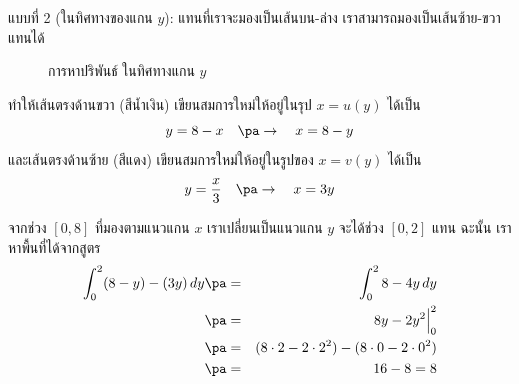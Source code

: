 \begin{frame}
\begin{sol} แบบที่ 2 (ในทิศทางของแกน $y$): \pa แทนที่เราจะมองเป็นเส้นบน-ล่าง เราสามารถมองเป็นเส้นซ้าย-ขวาแทนได้ \pa

\begin{figure}[h!]
\centering
{}
\caption{การหาปริพันธ์ ในทิศทางแกน $y$}
\end{figure}


ทำให้เส้นตรงด้านขวา (สีน้ำเงิน) เขียนสมการใหม่ให้อยู่ในรุป $x = u(y)$ ได้เป็น \pa
\[ y = 8-x \quad \pa \rightarrow \quad x = 8-y\] \pa
และเส้นตรงด้านซ้าย (สีแดง) เขียนสมการใหม่ให้อยู่ในรูปของ $x = v(y)$ ได้เป็น \pa
\[ y = \frac{x}{3} \quad \pa \rightarrow \quad x = 3y\]
\end{sol}
\end{frame}

\begin{frame}
\begin{sol} 
จากช่วง $[0,8]$ ที่มองตามแนวแกน $x$ เราเปลี่ยนเป็นแนวแกน $y$ จะได้ช่วง $[0,2]$ แทน \pa ฉะนั้น เราหาพื้นที่ได้จากสูตร
\begin{eqnarray*}
\int_0^2 (8-y) - (3y) \, dy \pa &=& \int_0^2 8 - 4y \, dy \\ \pa
&=& 8y - 2y^2 \Big|_0^2 \\ \pa
&=& ( 8\cdot 2 - 2\cdot 2^2 ) - (8 \cdot 0 - 2 \cdot 0^2) \\ \pa
&=& 16 - 8 = 8
\end{eqnarray*}
\end{sol}
\end{frame}



